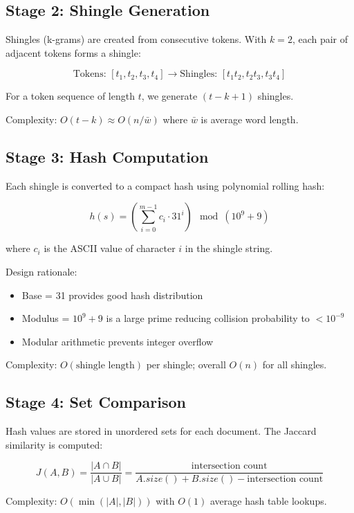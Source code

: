 \documentclass[12pt,oneside,openany]{report}
\begin{document}
\subsection{Stage 2: Shingle Generation}

Shingles (k-grams) are created from consecutive tokens. With $k=2$, each pair of adjacent tokens forms a shingle:

$$\text{Tokens: } [t_1, t_2, t_3, t_4] \rightarrow \text{Shingles: } [t_1t_2, t_2t_3, t_3t_4]$$

For a token sequence of length $t$, we generate $(t - k + 1)$ shingles.

Complexity: $O(t - k) \approx O(n/\bar{w})$ where $\bar{w}$ is average word length.

\subsection{Stage 3: Hash Computation}

Each shingle is converted to a compact hash using polynomial rolling hash:

$$h(s) = \left( \sum_{i=0}^{m-1} c_i \cdot 31^i \right) \mod (10^9 + 9)$$

where $c_i$ is the ASCII value of character $i$ in the shingle string.

Design rationale:
\begin{itemize}
  \item Base = 31 provides good hash distribution
  \item Modulus = $10^9 + 9$ is a large prime reducing collision probability to $< 10^{-9}$
  \item Modular arithmetic prevents integer overflow
\end{itemize}

Complexity: $O(\text{shingle length})$ per shingle; overall $O(n)$ for all shingles.

\subsection{Stage 4: Set Comparison}

Hash values are stored in unordered sets for each document. The Jaccard similarity is computed:

$$J(A, B) = \frac{|A \cap B|}{|A \cup B|} = \frac{\text{intersection count}}{A.size() + B.size() - \text{intersection count}}$$

Complexity: $O(\min(|A|, |B|))$ with $O(1)$ average hash table lookups.
\end{document}
